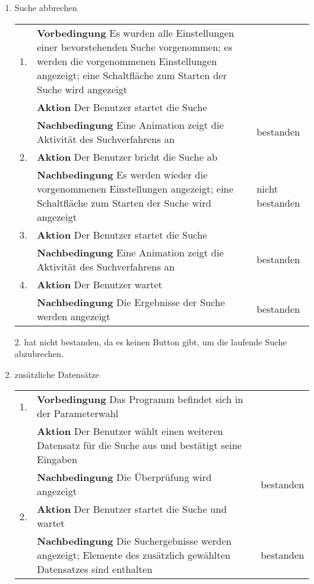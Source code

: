 \begin{enumerate} [label=\bfseries /TSW \arabic*0/, leftmargin=*]
	\item Suche abbrechen \newline \newline
	\begin{tabular}{@{}rp{4in}|l}
	1. & \textbf{Vorbedingung} Es wurden alle Einstellungen einer bevorstehenden Suche vorgenommen; es werden die vorgenommenen Einstellungen angezeigt; eine Schaltfläche zum Starten der Suche wird angezeigt & \\
	   & \textbf{Aktion} Der Benutzer startet die Suche & \\
	   & \textbf{Nachbedingung} Eine Animation zeigt die Aktivität des Suchverfahrens an & bestanden \\
	\hline
	2. & \textbf{Aktion} Der Benutzer bricht die Suche ab & \\
	   & \textbf{Nachbedingung} Es werden wieder die vorgenommenen Einstellungen angezeigt; eine Schaltfläche zum Starten der Suche wird angezeigt & nicht bestanden \\
	\hline
	3. & \textbf{Aktion} Der Benutzer startet die Suche & \\
	   & \textbf{Nachbedingung} Eine Animation zeigt die Aktivität des Suchverfahrens an & bestanden \\
	\hline
	4. & \textbf{Aktion} Der Benutzer wartet & \\
	   & \textbf{Nachbedingung} Die Ergebnisse der Suche werden angezeigt & bestanden \\
	\end{tabular}
	\par
2. hat nicht bestanden, da es keinen Button gibt, um die laufende Suche abzubrechen.
	\newline

	\item zusätzliche Datensätze \newline \newline
	\begin{tabular}{@{}rp{4in}|l}
	1. & \textbf{Vorbedingung} Das Programm befindet sich in der Parameterwahl & \\
	   & \textbf{Aktion} Der Benutzer wählt einen weiteren Datensatz für die Suche aus und bestätigt seine Eingaben & \\
	   & \textbf{Nachbedingung} Die Überprüfung wird angezeigt & bestanden \\
	\hline	
	2. & \textbf{Aktion} Der Benutzer startet die Suche und wartet & \\
	   & \textbf{Nachbedingung} Die Suchergebnisse werden angezeigt; Elemente des zusätzlich gewählten Datensatzes sind enthalten & bestanden \\
	\end{tabular}
	\newline


\end{enumerate}
